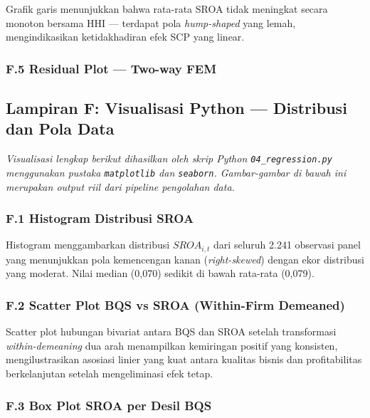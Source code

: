 \documentclass[12pt,a4paper]{article}
\begin{document}
Grafik garis menunjukkan bahwa rata-rata SROA tidak meningkat secara
monoton bersama HHI --- terdapat pola \emph{hump-shaped} yang lemah,
mengindikasikan ketidakhadiran efek SCP yang linear.

\subsubsection{F.5 Residual Plot --- Two-way
FEM}\label{f.5-residual-plot-two-way-fem}

\subsection{Lampiran F: Visualisasi Python --- Distribusi dan Pola
Data}\label{lampiran-f-visualisasi-python-distribusi-dan-pola-data-1}

\emph{Visualisasi lengkap berikut dihasilkan oleh skrip Python
\texttt{04\_regression.py} menggunakan pustaka \texttt{matplotlib} dan
\texttt{seaborn}. Gambar-gambar di bawah ini merupakan output riil dari
pipeline pengolahan data.}

\subsubsection{F.1 Histogram Distribusi
SROA}\label{f.1-histogram-distribusi-sroa-1}

Histogram menggambarkan distribusi \(SROA_{i,t}\) dari seluruh 2.241
observasi panel yang menunjukkan pola kemencengan kanan
(\emph{right-skewed}) dengan ekor distribusi yang moderat. Nilai median
(0,070) sedikit di bawah rata-rata (0,079).

\subsubsection{F.2 Scatter Plot BQS vs SROA (Within-Firm
Demeaned)}\label{f.2-scatter-plot-bqs-vs-sroa-within-firm-demeaned-1}

Scatter plot hubungan bivariat antara BQS dan SROA setelah transformasi
\emph{within-demeaning} dua arah menampilkan kemiringan positif yang
konsisten, mengilustrasikan asosiasi linier yang kuat antara kualitas
bisnis dan profitabilitas berkelanjutan setelah mengeliminasi efek
tetap.

\subsubsection{F.3 Box Plot SROA per Desil
BQS}\label{f.3-box-plot-sroa-per-desil-bqs-1}
\end{document}
